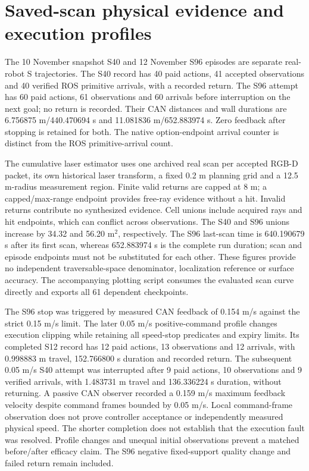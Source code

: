 \documentclass[11pt,a4paper]{article}
\begin{document}
\section{Saved-scan physical evidence and execution profiles}
The 10 November snapshot S40 and 12 November S96 episodes are separate real-robot S trajectories. The S40 record has 40 paid actions, 41 accepted observations and 40 verified ROS primitive arrivals, with a recorded return. The S96 attempt has 60 paid actions, 61 observations and 60 arrivals before interruption on the next goal; no return is recorded. Their CAN distances and wall durations are 6.756875 m/440.470694 s and 11.081836 m/652.883974 s. Zero feedback after stopping is retained for both. The native option-endpoint arrival counter is distinct from the ROS primitive-arrival count.

The cumulative laser estimator uses one archived real scan per accepted RGB-D packet, its own historical laser transform, a fixed 0.2 m planning grid and a 12.5 m-radius measurement region. Finite valid returns are capped at 8 m; a capped/max-range endpoint provides free-ray evidence without a hit. Invalid returns contribute no synthesized evidence. Cell unions include acquired rays and hit endpoints, which can conflict across observations. The S40 and S96 unions increase by 34.32 and 56.20 m$^2$, respectively. The S96 last-scan time is 640.190679 s after its first scan, whereas 652.883974 s is the complete run duration; scan and episode endpoints must not be substituted for each other. These figures provide no independent traversable-space denominator, localization reference or surface accuracy. The accompanying plotting script consumes the evaluated scan curve directly and exports all 61 dependent checkpoints.

The S96 stop was triggered by measured CAN feedback of 0.154 m/s against the strict 0.15 m/s limit. The later 0.05 m/s positive-command profile changes execution clipping while retaining all speed-stop predicates and expiry limits. Its completed S12 record has 12 paid actions, 13 observations and 12 arrivals, with 0.998883 m travel, 152.766800 s duration and recorded return. The subsequent 0.05 m/s S40 attempt was interrupted after 9 paid actions, 10 observations and 9 verified arrivals, with 1.483731 m travel and 136.336224 s duration, without returning. A passive CAN observer recorded a 0.159 m/s maximum feedback velocity despite command frames bounded by 0.05 m/s. Local command-frame observation does not prove controller acceptance or independently measured physical speed. The shorter completion does not establish that the execution fault was resolved. Profile changes and unequal initial observations prevent a matched before/after efficacy claim. The S96 negative fixed-support quality change and failed return remain included.
\end{document}

